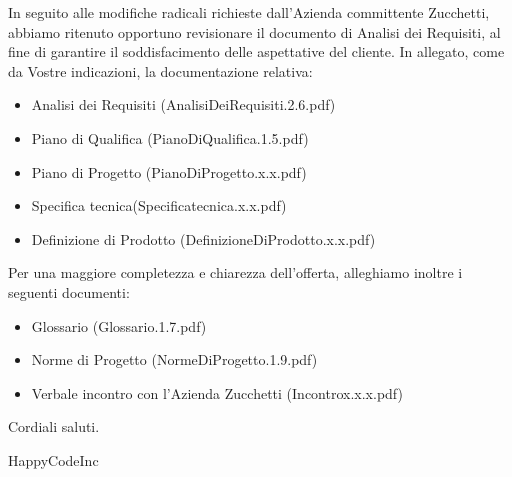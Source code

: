 \documentclass[11pt,titlepage,a4paper]{report}
\begin{document}
In seguito alle modifiche radicali richieste dall'Azienda committente Zucchetti, abbiamo ritenuto opportuno revisionare il documento di Analisi dei Requisiti, al fine di garantire il soddisfacimento delle aspettative del cliente. \newline
In allegato, come da Vostre indicazioni, la documentazione relativa:
\begin{itemize}
\item{}Analisi dei Requisiti (AnalisiDeiRequisiti.2.6.pdf)
\item{}Piano di Qualifica (PianoDiQualifica.1.5.pdf)
\item{}Piano di Progetto (PianoDiProgetto.x.x.pdf)
\item{}Specifica tecnica(Specificatecnica.x.x.pdf) 
\item{}Definizione di Prodotto (DefinizioneDiProdotto.x.x.pdf)
\end{itemize}
Per una maggiore completezza e chiarezza dell'offerta, alleghiamo inoltre i seguenti documenti:
\begin{itemize}
\item{}Glossario (Glossario.1.7.pdf)
\item{}Norme di Progetto (NormeDiProgetto.1.9.pdf)
\item{}Verbale incontro con l'Azienda Zucchetti (Incontrox.x.x.pdf)
\end{itemize}
Cordiali saluti.
\begin{flushright}
HappyCodeInc
\end{flushright}
\end{document}
